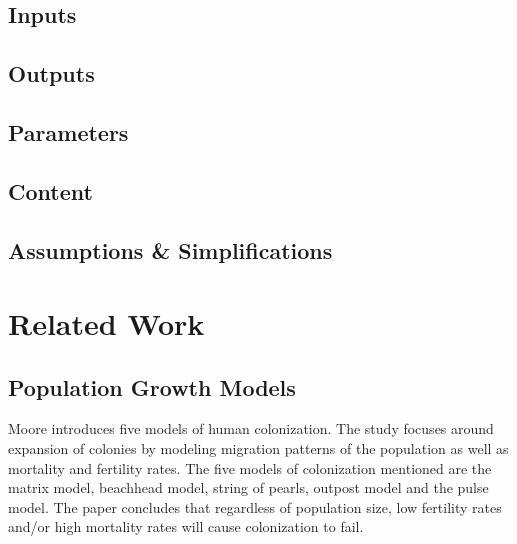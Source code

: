 \documentclass[12pt]{article}
\begin{document}
\subsection{Inputs}
\subsection{Outputs}
\subsection{Parameters}
\subsection{Content}
\subsection{Assumptions \& Simplifications}

\section{Related Work}
\label{sec:relatedwork}

\subsection{Population Growth Models}

Moore \cite{moore2001evaluating} introduces five models of human
colonization. The study focuses around expansion of colonies by modeling
migration patterns of the population as well as mortality and fertility rates.
The five models of colonization mentioned are the matrix model, beachhead
model, string of pearls, outpost model and the pulse model. The paper
concludes that regardless of population size, low fertility rates and/or high
mortality rates will cause colonization to fail.
\end{document}

